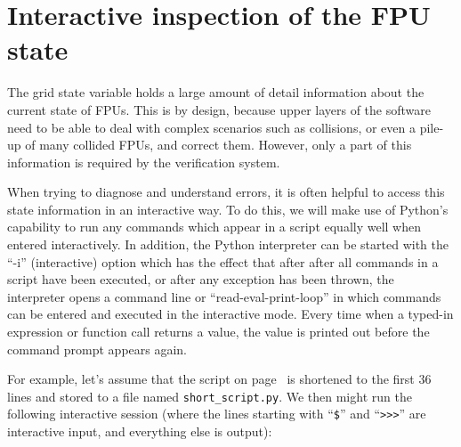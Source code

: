 \documentclass[fontsize=12,a4paper]{scrreprt}
\begin{document}
\section{Interactive inspection of the FPU state}
\label{sec:fpu_states_interactive_inspection}
%

The grid state variable holds a large amount of detail information
about the current state of FPUs. This is by design, because upper
layers of the software need to be able to deal with complex scenarios
such as collisions, or even a pile-up of many collided FPUs, and
correct them. However, only a part of this information is required by
the verification system.

When trying to diagnose and understand errors, it is often helpful to
access this state information in an interactive way.  To do this, we
will make use of Python's capability to run any commands which appear
in a script equally well when entered interactively. In addition, the
Python interpreter can be started with the ``-i'' (interactive) option
which has the effect that after after all commands in a script have
been executed, or after any exception has been thrown, the interpreter
opens a command line or ``read-eval-print-loop'' in which commands can
be entered and executed in the interactive mode. Every time when a
typed-in expression or function call returns a value, the value is
printed out before the command prompt appears again.

For example, let's assume that the script on
page~\pageref{sec:minimalexample} is shortened to the first 36 lines
and stored to a file named \texttt{short\_script.py}. We then might
run the following interactive session (where the lines starting with
``\texttt{\$}'' and ``\verb+>>>+'' are interactive input, and
everything else is output):
\end{document}
